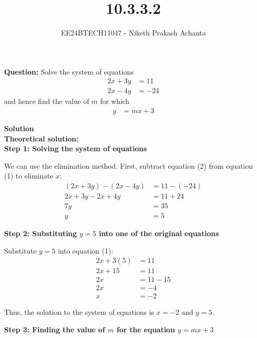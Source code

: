 \documentclass[journal]{IEEEtran}
\begin{document}
	
	
	\vspace{3cm}
	
	\title{10.3.3.2}
	\author{EE24BTECH11047 - Niketh Prakash Achanta}
	{\let\newpage\relax\maketitle}
	
	\renewcommand{\thefigure}{\theenumi}
	\renewcommand{\thetable}{\theenumi}
	\setlength{\intextsep}{10pt} %
	
\textbf{Question:} Solve the system of equations
\begin{align*}
2x + 3y &= 11 \\
2x - 4y &= -24
\end{align*}
and hence find the value of \( m \) for which
\begin{align*}
y &= mx + 3
\end{align*}

\textbf{Solution}\\
\textbf{Theoretical solution:}\\
\textbf{Step 1: Solving the system of equations}

We can use the elimination method. First, subtract equation (2) from equation (1) to eliminate \( x \):
\begin{align}
(2x + 3y) - (2x - 4y) &= 11 - (-24) \\
2x + 3y - 2x + 4y &= 11 + 24 \\
7y &= 35 \\
y &= 5
\end{align}

\textbf{Step 2: Substituting \( y = 5 \) into one of the original equations}

Substitute \( y = 5 \) into equation (1):
\begin{align}
2x + 3(5) &= 11 \\
2x + 15 &= 11 \\
2x &= 11 - 15 \\
2x &= -4 \\
x &= -2
\end{align}

Thus, the solution to the system of equations is \( x = -2 \) and \( y = 5 \).

\textbf{Step 3: Finding the value of \( m \) for the equation \( y = mx + 3 \)}
\end{document}
